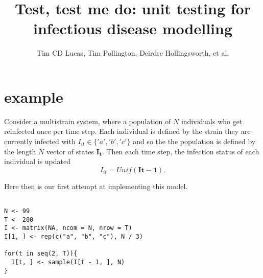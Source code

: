 \documentclass{article}
\title{Test, test me do: unit testing for infectious disease modelling}
\author{Tim CD Lucas, Tim Pollington, Deirdre Hollingsworth, et al.}
\begin{document}







\maketitle


\section{ example}

Consider a multistrain system, where a population of $N$ individuals who get reinfected once per time step. 
Each individual is defined by the strain they are currently infected with $I_{it} \in \{'a', 'b', 'c'\}$ and so the the population is defined by the length $N$ vector of states $\mathbf{I_t}$.
Then each time step, the infection status of each individual is updated
$$I_{it} = Unif(\mathbf{I{t-1}}).$$

Here then is our first attempt at implementing this model.

\begin{lstlisting}

N <- 99
T <- 200
I <- matrix(NA, ncom = N, nrow = T)
I[1, ] <- rep(c("a", "b", "c"), N / 3)

for(t in seq(2, T)){
  I[t, ] <- sample(I[t - 1, ], N)
}
\end{lstlisting}
\end{document}
